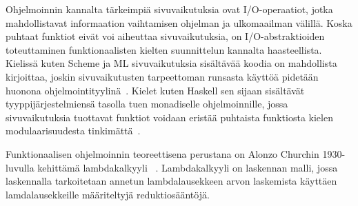 \par
Ohjelmoinnin kannalta tärkeimpiä sivuvaikutuksia ovat I/O-operaatiot, jotka mahdollistavat informaation vaihtamisen ohjelman ja ulkomaailman välillä.
Koska puhtaat funktiot eivät voi aiheuttaa sivuvaikutuksia, on I/O-abstraktioiden toteuttaminen funktionaalisten kielten suunnittelun kannalta haasteellista. Kielissä kuten Scheme ja ML sivuvaikutuksia sisältävää koodia on mahdollista kirjoittaa, joskin sivuvaikutusten tarpeettoman runsasta käyttöä pidetään huonona ohjelmointityylinä~\cite[s.~23]{Hudak89}. Kielet kuten Haskell sen sijaan sisältävät tyyppijärjestelmiensä tasolla tuen monadiselle ohjelmoinnille, jossa sivuvaikutuksia tuottavat funktiot voidaan eristää puhtaista funktiosta kielen modulaarisuudesta tinkimättä~\cite[s.~4--16]{PJ2000}.
\par
Funktionaalisen ohjelmoinnin teoreettisena perustana on Alonzo Churchin 1930-luvulla kehittämä lambdakalkyyli ~\cite[s.~37--50]{PJ1987}. Lambdakalkyyli on laskennan malli, jossa laskennalla tarkoitetaan annetun lambdalausekkeen arvon laskemista käyttäen lamdalausekkeille määriteltyjä reduktiosääntöjä.